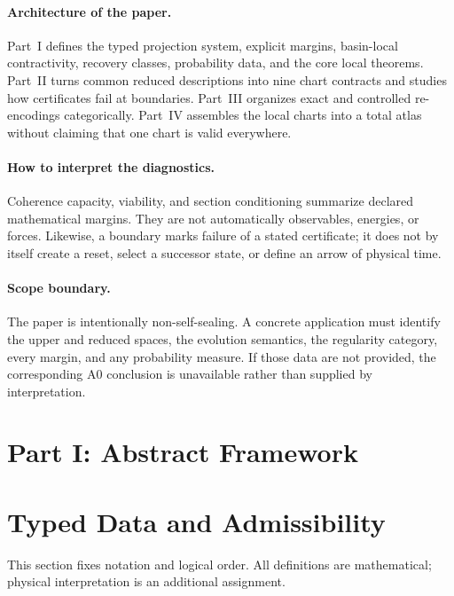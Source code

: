 \documentclass[11pt]{article}
\theoremstyle{plain}
\theoremstyle{plain}
\begin{document}
\paragraph{Architecture of the paper.}
Part~I defines the typed projection system, explicit margins, basin-local
contractivity, recovery classes, probability data, and the core local
theorems.  Part~II turns common reduced descriptions into nine chart
contracts and studies how certificates fail at boundaries.  Part~III
organizes exact and controlled re-encodings categorically.  Part~IV assembles
the local charts into a total atlas without claiming that one chart is valid
everywhere.

\paragraph{How to interpret the diagnostics.}
Coherence capacity, viability, and section conditioning summarize declared
mathematical margins.  They are not automatically observables, energies, or
forces.  Likewise, a boundary marks failure of a stated certificate; it does
not by itself create a reset, select a successor state, or define an arrow of
physical time.

\paragraph{Scope boundary.}
The paper is intentionally non-self-sealing.  A concrete application must
identify the upper and reduced spaces, the evolution semantics, the regularity
category, every margin, and any probability measure.  If those data are not
provided, the corresponding A0 conclusion is unavailable rather than supplied
by interpretation.

\tableofcontents
\newpage

\section*{Part I: Abstract Framework}

\section{Typed Data and Admissibility}

This section fixes notation and logical order.  All definitions are
mathematical; physical interpretation is an additional assignment.
\end{document}

